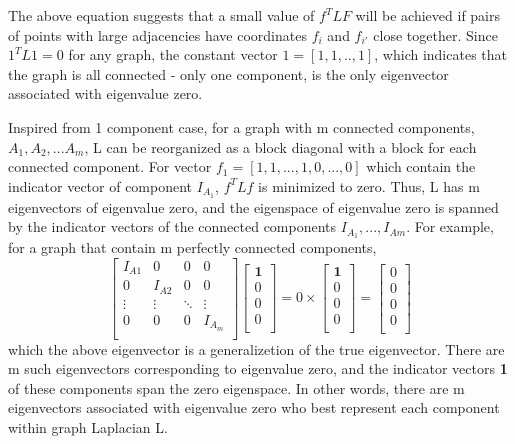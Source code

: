 \documentclass{article}
\begin{document}
The above equation suggests that a small value of $f^TLF$ will be achieved if pairs of points with large adjacencies have coordinates $f_i$ and $f_{i'}$ close together. Since $1^TL1 = 0$ for any graph, the constant vector $1 = [1, 1, .. ,1]$, which indicates that the graph is all connected - only one component, is the only eigenvector associated with eigenvalue zero.

Inspired from 1 component case, for a graph with m connected components, $A_1, A_2, ... A_m$, L can be reorganized as a block diagonal with a block for each connected component. For vector $f_1 = [1, 1, ..., 1, 0, ..., 0]$ which contain the indicator vector of component $I_{A_1}$, $f^TLf$ is minimized to zero. Thus, L has m eigenvectors of eigenvalue zero, and the eigenspace of eigenvalue zero is spanned by the indicator vectors of the connected components $I_{A_1}, ... , I_{Am}$. For example, for a graph that contain m perfectly connected components,
$$
\begin{bmatrix}
I_{A1}&0&0&0\\
0&I_{A2}&0&0\\
\vdots&\vdots&\ddots&\vdots\\
0&0&0&I_{A_m}\\
\end{bmatrix}
\begin{bmatrix}
\mathbf{1}\\
0\\
0\\
0\\
\end{bmatrix}
= 0 \times 
\begin{bmatrix}
\mathbf{1}\\
0\\
0\\
0\\
\end{bmatrix}
=
\begin{bmatrix}
0\\
0\\
0\\
0\\
\end{bmatrix}
$$
which the above eigenvector is a generalizetion of the true eigenvector. There are m such eigenvectors corresponding to eigenvalue zero, and the indicator vectors \textbf{1} of these components span the zero eigenspace. In other words, there are m eigenvectors associated with eigenvalue zero who best represent each component within graph Laplacian L.
\end{document}
